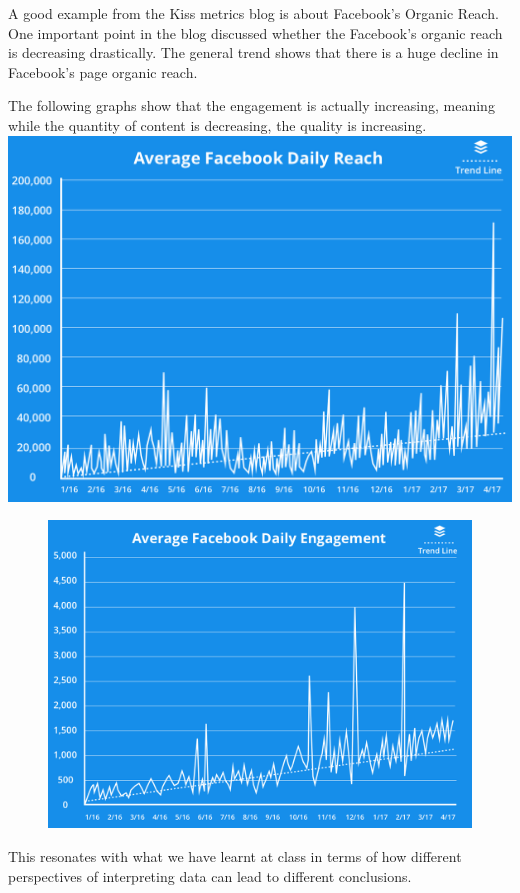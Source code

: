 \documentclass[]{book}
\theoremstyle{definition}
\theoremstyle{definition}
\theoremstyle{definition}
\theoremstyle{remark}
\begin{document}
A good example from the Kiss metrics blog is about Facebook's Organic
Reach. One important point in the blog discussed whether the Facebook's
organic reach is decreasing drastically. The general trend shows that
there is a huge decline in Facebook's page organic reach.

The following graphs show that the engagement is actually increasing,
meaning while the quantity of content is decreasing, the quality is
increasing. \includegraphics{images/average-facebook-reach.png}

\begin{figure}
\centering
\includegraphics{images/average-facebook-daily-reach.png}
\caption{}
\end{figure}

This resonates with what we have learnt at class in terms of how
different perspectives of interpreting data can lead to different
conclusions.
\end{document}
